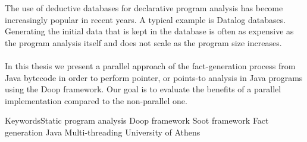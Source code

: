 \documentclass{dithesis}
\renewcommand{\university}{National and Kapodistrian University of Athens}
\renewcommand{\school}{School of Science}
\renewcommand{\department}{Department of Informatics and Telecommunications}
\renewcommand{\thesisplace}{Athens}
\renewcommand{\thesisdate}{July 2016}
\renewcommand{\thesislabel}{Undergraduate Thesis}
\renewcommand{\supervisorlabel}{Supervisors}
\renewcommand{\idlabel}{R.N.}
\begin{document}
\begin{otherlanguage}{english}
\maketitle
\setcounter{page}{3}
\end{otherlanguage}


\begin{otherlanguage}{greek}
\renewcommand{\university}{Εθνικό και Καποδιστριακό Πανεπιστήμιο Αθηνών}
\renewcommand{\school}{Σχολή Θετικών Επιστημών}
\renewcommand{\department}{Τμήμα Πληροφορικής και Τηλεπικοινωνιών}
\renewcommand{\thesisplace}{Αθήνα}
\renewcommand{\thesisdate}{Ιούλιος 2016}
\renewcommand{\thesislabel}{Πτυχιακή Εργασία}
\renewcommand{\supervisorlabel}{Επιβλέποντες}
\renewcommand{\idlabel}{Α.Μ.}
\let\thesupervisorslist\undefined
{}
\maketitlesecond
\end{otherlanguage}



\begin{thesisabstract}[ABSTRACT]
	The use of deductive databases for declarative program analysis has become increasingly popular in recent years. A typical example is Datalog databases. Generating the initial data that is kept in the database is often as expensive as the program analysis itself and does not scale as the program size increases.\\
	\\
    In this thesis we present a parallel approach of the fact-generation process from Java bytecode in order to perform pointer, or points-to analysis in Java programs using the Doop framework. Our goal is to evaluate the benefits of a parallel implementation compared to the non-parallel one.

                {Keywords}{Static program analysis}
                            {Doop framework}
                            {Soot framework}
                            {Fact generation}
                            {Java Multi-threading}
                            {University of Athens}
\end{thesisabstract}
\end{document}
